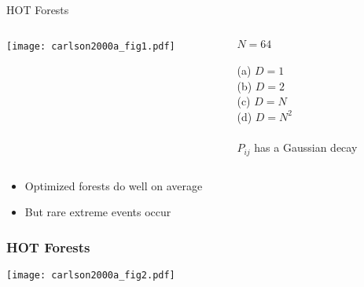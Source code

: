 \begin{frame}
  
  \begin{block}{HOT Forests}
  \begin{columns} 
    \begin{column}{0.6\textwidth} 
      \texttt{[image: carlson2000a\_fig1.pdf]}\cite{carlson2000a}\\
    \end{column}
    \begin{column}{0.3\textwidth}
      $N=64$\\
      \mbox{}\\
      \alert{(a)} $D=1$\\
      \alert{(b)} $D=2$\\ 
      \alert{(c)} $D=N$\\
      \alert{(d)} $D = N^2$\\
      \mbox{}\\
      $P_{ij}$ has a Gaussian decay
    \end{column}
  \end{columns}

  \begin{itemize}
  \item<2->
    Optimized forests do well on average 
  \item<3->
    But rare extreme events occur 
  \end{itemize}
  \end{block}




\end{frame}

\begin{frame}
  \frametitle{HOT Forests}

  \begin{block}{}
      \texttt{[image: carlson2000a\_fig2.pdf]}\cite{carlson2000a}
  \end{block}

\end{frame}

